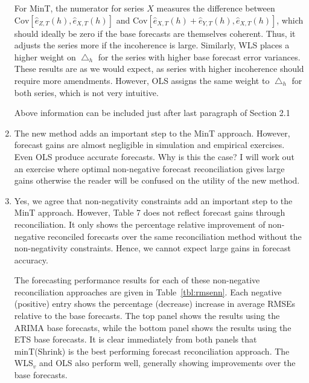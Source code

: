 \documentclass[10pt,a4paper]{article}
\begin{document}
\begin{enumerate}
{\begin{table}[ht]
\begin{threeparttable}
\begin{tablenotes}
			\end{tablenotes}
		\end{threeparttable}
	\end{table}
	For MinT, the numerator for series $X$ measures the difference between $\text{Cov}[\hat{e}_{Z, T}(h), \hat{e}_{X, T}(h)]$ and $\text{Cov}[\hat{e}_{X, T}(h) + \hat{e}_{Y, T}(h), \hat{e}_{X, T}(h)]$, which should ideally be zero if the base forecasts are themselves coherent. Thus, it adjusts the series more if the incoherence is large. Similarly, WLS places a higher weight on $\bigtriangleup_{h}$ for the series with higher base forecast error variances. These results are as we would expect, as series with higher incoherence should require more amendments. However, OLS assigns the same weight to $\bigtriangleup_{h}$ for both series, which is not very intuitive. 
	}

	{\color{red} Above information can be included just after last paragraph of Section 2.1}
	\newpage 
	\item The new method adds an important step to the MinT approach. However, forecast gains are almost negligible in simulation and empirical exercises. Even OLS produce accurate forecasts. Why is this the case? I will work out an exercise where optimal non-negative forecast reconciliation gives large gains otherwise the reader will be confused on the utility of the new method.
	\item [] {\color{blue} Yes, we agree that non-negativity constraints add an important step to the MinT approach. However, Table 7 does not reflect forecast gains through reconciliation. It only shows the percentage relative improvement of non-negative reconciled forecasts over the same reconciliation method without the non-negativity constraints. Hence, we cannot expect large gains in forecast accuracy.
		
	The forecasting performance results for each of these non-negative reconciliation approaches are given in Table~\ref{tbl:rmsenn}. Each negative (positive) entry shows the percentage (decrease) increase in average RMSEs relative to the base forecasts. The top panel shows the results using the ARIMA base forecasts, while the bottom panel shows the results using the ETS base forecasts. It is clear immediately from both panels that minT(Shrink) is the best performing forecast reconciliation approach. The WLS$_v$ and OLS also perform well, generally showing improvements over the base forecasts.
	
}
\end{enumerate}
\end{document}
